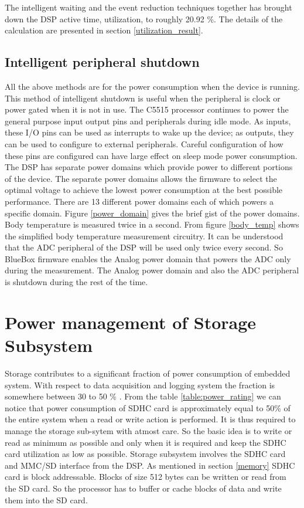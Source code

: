  The intelligent waiting and the event reduction techniques together has brought down the DSP active time, utilization, to roughly 20.92 \%. The details of the calculation are presented in section \ref{utilization_result}.

\subsection{Intelligent peripheral shutdown}
All the above methods are for the power consumption when the device is running. This method of intelligent shutdown is useful when the peripheral is clock or power gated when it is not in use. The C5515 processor continues to power the general purpose input output pins and peripherals during idle mode. As inputs, these I/O pins can be used as interrupts to wake up the device; as outputs, they can be used to configure to external peripherals. Careful configuration of how these pins are configured can have large effect on sleep mode power consumption. The DSP has separate power domains which provide power to different portions of the device. The separate power domains allows the firmware to select the optimal voltage to achieve the lowest power consumption at the best possible performance. There are 13 different power domains each of which powers a specific domain. Figure \ref{power_domain} gives the brief gist of the power domains. Body temperature is measured twice in a second. From figure \ref{body_temp} shows the simplified body temperature measurement circuitry. It can be understood that the ADC peripheral of the DSP will be used only twice every second. So BlueBox firmware enables the Analog power domain that powers the ADC only during the measurement. The Analog power domain and also the ADC peripheral is shutdown during the rest of the time. 

\section{Power management of Storage Subsystem}
Storage contributes to a significant fraction of power consumption of embedded system. With respect to data acquisition and logging system the fraction is somewhere between 30 to 50 \% . From the table \ref{table:power_rating} we can notice that power consumption of SDHC card is approximately equal to 50\% of the entire system when a read or write action is performed. It is thus required to manage the storage sub-sytem with atmost care. So the basic idea is to write or read as minimum as possible and only when it is required and keep the SDHC card utilization as low as possible.
Storage subsystem involves the SDHC card and MMC/SD interface from the DSP. As mentioned in section \ref{memory} SDHC card is block addressable. Blocks of size 512 bytes can be written or read from the SD card. So the processor has to buffer or cache blocks of data and write them into the SD card.  

